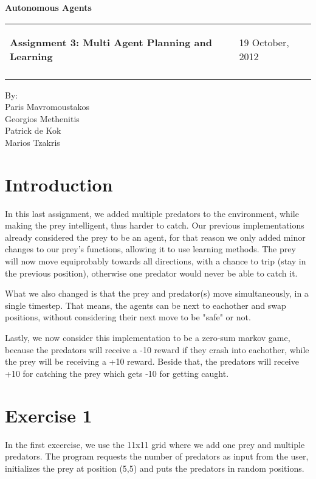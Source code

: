 \documentclass[a4paper,11pt]{article}
\makeatletter
\newcommand{\resheading}[1]{{\large \colorbox{mygrey}{\begin{minipage}{\textwidth}{\textbf{#1 \vphantom{p\^{E}}}}\end{minipage}}}}
\newcommand{\mywebheader}{
  \begin{tabular}{@{}p{5in}p{4in}}
  {\resheading{Assignment 3: Multi Agent Planning and Learning}} & {\Large 19 October, 2012}\\\vspace{0.2cm}
  \end{tabular}}
\makeatother
\begin{document}
\begin{center}
{\LARGE \textbf{Autonomous Agents}}\\ [1em]
\end{center}
\mywebheader

\begin{center}
{\Large By:} \\ \vspace{0.1cm}
{\Large Paris Mavromoustakos} \\  \vspace{0.1cm}
{\Large Georgios Methenitis} \\ \vspace{0.1cm}
{\Large Patrick de Kok} \\ \vspace{0.1cm}
{\Large Marios Tzakris}
\end{center}




\section*{Introduction}

In this last assignment, we added multiple predators to the environment, while making the prey intelligent, thus harder to catch. Our previous implementations already considered the prey to be an agent, for that reason we only added minor changes to our prey's functions, allowing it to use learning methods. The prey will now move equiprobably towards all directions, with a chance to trip (stay in the previous position), otherwise one predator would never be able to catch it.

What we also changed is that the prey and predator(s) move simultaneously, in a single timestep. That means, the agents can be next to eachother and swap positions, without considering their next move to be "safe" or not.

Lastly, we now consider this implementation to be a zero-sum markov game, because the predators will receive a -10 reward if they crash into eachother, while the prey will be receiving a +10 reward. Beside that, the predators will receive +10 for catching the prey which gets -10 for getting caught.



\section*{Exercise 1}

In the first excercise, we use the 11x11 grid where we add one prey and multiple predators. The program requests the number of predators as input from the user, initializes the prey at position (5,5) and puts the predators in random positions. 
\end{document}
